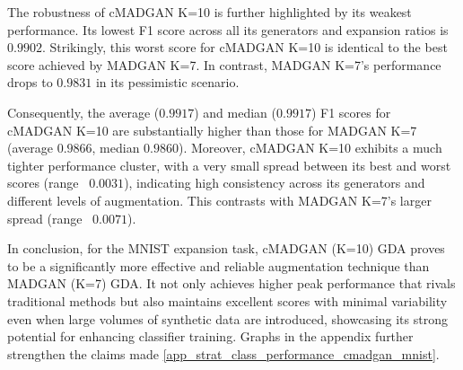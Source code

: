 The robustness of cMADGAN K=10 is further highlighted by its weakest performance. Its lowest F1 score across all its generators and expansion ratios is $0.9902$. Strikingly, this worst score for cMADGAN K=10 is identical to the best score achieved by MADGAN K=7. In contrast, MADGAN K=7's performance drops to $0.9831$ in its pessimistic scenario.

Consequently, the average ($0.9917$) and median ($0.9917$) F1 scores for cMADGAN K=10 are substantially higher than those for MADGAN K=7 (average $0.9866$, median $0.9860$). Moreover, cMADGAN K=10 exhibits a much tighter performance cluster, with a very small spread between its best and worst scores (range ~$0.0031$), indicating high consistency across its generators and different levels of augmentation. This contrasts with MADGAN K=7's larger spread (range ~$0.0071$).

In conclusion, for the MNIST expansion task, cMADGAN (K=10) GDA proves to be a significantly more effective and reliable augmentation technique than MADGAN (K=7) GDA. It not only achieves higher peak performance that rivals traditional methods but also maintains excellent scores with minimal variability even when large volumes of synthetic data are introduced, showcasing its strong potential for enhancing classifier training. Graphs in the appendix further strengthen the claims made \ref{app_strat_class_performance_cmadgan_mnist}.


